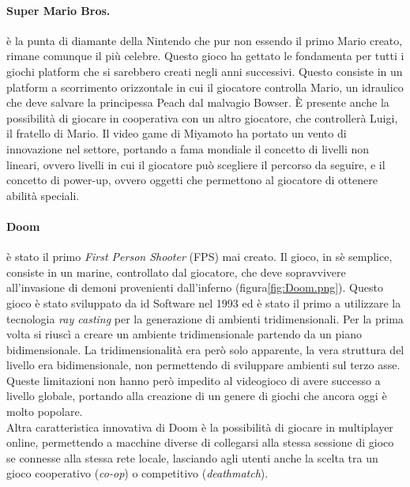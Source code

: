         \paragraph{Super Mario Bros.} è la punta di diamante della Nintendo che pur non essendo il primo Mario creato, rimane comunque il più celebre. Questo gioco ha gettato le fondamenta
            per tutti i giochi platform che si sarebbero creati negli anni successivi. Questo consiste in un platform a scorrimento orizzontale in cui il giocatore controlla Mario, 
            un idraulico che deve salvare la principessa Peach dal malvagio Bowser. È presente anche la possibilità di giocare in cooperativa con un altro giocatore, che controllerà
            Luigi, il fratello di Mario. Il video game di Miyamoto ha portato un vento di innovazione nel settore, portando a fama mondiale il concetto di livelli non lineari, ovvero
            livelli in cui il giocatore può scegliere il percorso da seguire, e il concetto di power-up, ovvero oggetti che permettono al giocatore di ottenere abilità speciali.\cite{ryan2011}
            
        \paragraph{Doom} è stato il primo \textit{First Person Shooter} (FPS) mai creato. Il gioco, in sè semplice, consiste in un marine, controllato dal giocatore, che deve sopravvivere
            all'invasione di demoni provenienti dall'inferno (figura\ref{fig:Doom.png}). Questo gioco è stato sviluppato da id Software nel 1993 ed è stato il primo a utilizzare la tecnologia \textit{ray casting} 
            per la generazione di ambienti tridimensionali. Per la prima volta si riuscì a creare un ambiente tridimensionale partendo da un piano bidimensionale. La tridimensionalità era
            però solo apparente, la vera struttura del livello era bidimensionale, non permettendo di sviluppare ambienti sul terzo asse. Queste limitazioni non hanno
            però impedito al videogioco di avere successo a livello globale, portando alla creazione di un genere di giochi che ancora oggi è molto popolare.\\
            Altra caratteristica innovativa di Doom è la possibilità di giocare in multiplayer online, permettendo a macchine diverse di collegarsi alla stessa sessione di gioco
            se connesse alla stessa rete locale, lasciando agli utenti anche la scelta tra un gioco cooperativo (\textit{co-op}) o competitivo (\textit{deathmatch}).
        
